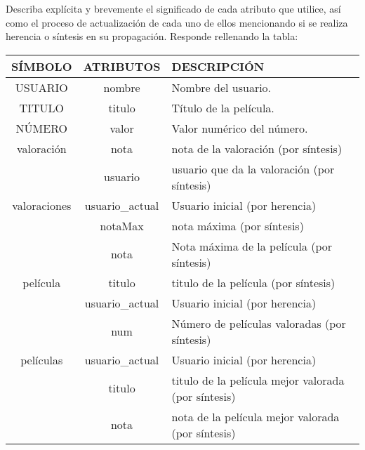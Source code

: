 \begin{problem}[1]
Describa explícita y brevemente el significado de cada atributo que utilice, así como el proceso de actualización de cada uno de ellos mencionando si se realiza herencia o síntesis en su propagación. Responde rellenando la tabla:
\solution
\begin{tabular}{|c|c|l|}
\hline
SÍMBOLO & ATRIBUTOS & DESCRIPCIÓN \\
\hline
\hline
USUARIO & nombre & Nombre del usuario.\\
\hline
TITULO & titulo & Título de la película.\\
\hline
NÚMERO & valor & Valor numérico del número.\\
\hline
valoración & nota & nota de la valoración (por síntesis) \\
\cline{2-3}
& usuario & usuario que da la valoración (por síntesis)\\
\hline
valoraciones & usuario\_actual & Usuario inicial (por herencia)\\
\cline{2-3}
& notaMax & nota máxima (por síntesis) \\
\hline
& nota & Nota máxima de la película (por síntesis)\\
\cline{2-3}
película & titulo & titulo de la película (por síntesis) \\
\cline{2-3}
& usuario\_actual & Usuario inicial (por herencia) \\
\hline
& num & Número de películas valoradas (por síntesis)\\
\cline{2-3}
películas & usuario\_actual & Usuario inicial (por herencia) \\
\cline{2-3}
& titulo & titulo de la película mejor valorada (por síntesis) \\
\cline{2-3}
& nota & nota de la película mejor valorada (por síntesis)\\
\hline
\end{tabular}
\end{problem}

